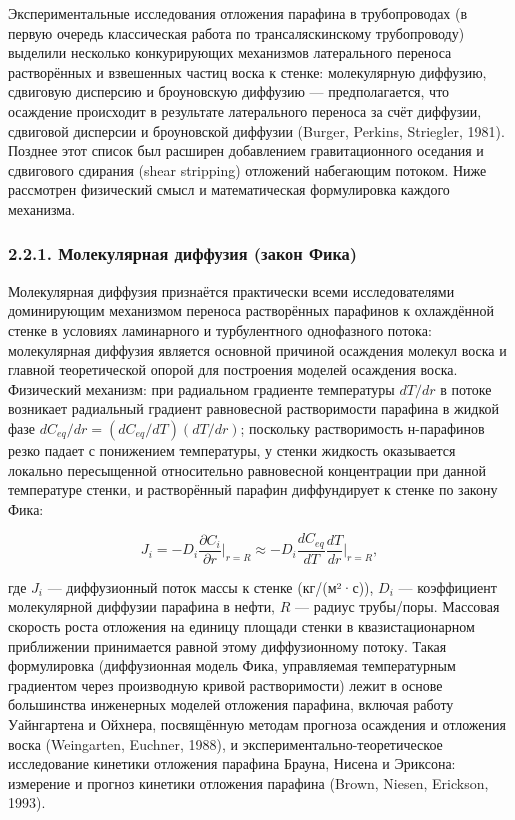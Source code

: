 \documentclass[11pt]{extarticle}
\begin{document}
Экспериментальные исследования отложения парафина в трубопроводах (в первую очередь классическая работа по трансаляскинскому трубопроводу) выделили несколько конкурирующих механизмов латерального переноса растворённых и взвешенных частиц воска к стенке: молекулярную диффузию, сдвиговую дисперсию и броуновскую диффузию --- предполагается, что осаждение происходит в результате латерального переноса за счёт диффузии, сдвиговой дисперсии и броуновской диффузии (Burger, Perkins, Striegler, 1981). Позднее этот список был расширен добавлением гравитационного оседания и сдвигового сдирания (shear stripping) отложений набегающим потоком. Ниже рассмотрен физический смысл и математическая формулировка каждого механизма.

\subsubsection{2.2.1. Молекулярная диффузия (закон Фика)}\label{ux43cux43eux43bux435ux43aux443ux43bux44fux440ux43dux430ux44f-ux434ux438ux444ux444ux443ux437ux438ux44f-ux437ux430ux43aux43eux43d-ux444ux438ux43aux430}

Молекулярная диффузия признаётся практически всеми исследователями доминирующим механизмом переноса растворённых парафинов к охлаждённой стенке в условиях ламинарного и турбулентного однофазного потока: молекулярная диффузия является основной причиной осаждения молекул воска и главной теоретической опорой для построения моделей осаждения воска. Физический механизм: при радиальном градиенте температуры \(dT/dr\) в потоке возникает радиальный градиент равновесной растворимости парафина в жидкой фазе \(dC_{eq}/dr = (dC_{eq}/dT)(dT/dr)\); поскольку растворимость н-парафинов резко падает с понижением температуры, у стенки жидкость оказывается локально пересыщенной относительно равновесной концентрации при данной температуре стенки, и растворённый парафин диффундирует к стенке по закону Фика:

\[
J_i = -D_i \frac{\partial C_i}{\partial r}\bigg|_{r=R} \approx -D_i \frac{dC_{eq}}{dT}\frac{dT}{dr}\bigg|_{r=R},
\]

где \(J_i\) --- диффузионный поток массы к стенке (кг/(м²·с)), \(D_i\) --- коэффициент молекулярной диффузии парафина в нефти, \(R\) --- радиус трубы/поры. Массовая скорость роста отложения на единицу площади стенки в квазистационарном приближении принимается равной этому диффузионному потоку. Такая формулировка (диффузионная модель Фика, управляемая температурным градиентом через производную кривой растворимости) лежит в основе большинства инженерных моделей отложения парафина, включая работу Уайнгартена и Ойхнера, посвящённую методам прогноза осаждения и отложения воска (Weingarten, Euchner, 1988), и экспериментально-теоретическое исследование кинетики отложения парафина Брауна, Нисена и Эриксона: измерение и прогноз кинетики отложения парафина (Brown, Niesen, Erickson, 1993).
\end{document}
